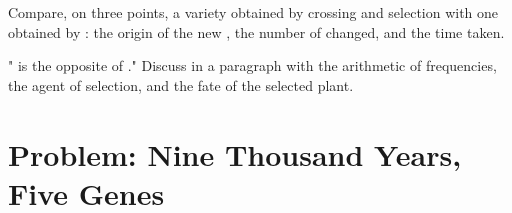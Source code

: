 \begin{exercise}[$\star\star\star$]\label{exo:g12:domesticated-plants:14}
Compare, on three points, a variety obtained by crossing and
selection with one obtained by : the origin of the new
, the number of  changed, and the time taken.
\end{exercise}

\begin{exercise}[$\star\star\star$]\label{exo:g12:domesticated-plants:15}
" is the opposite of ." Discuss in a
paragraph with the arithmetic of  frequencies, the agent of
selection, and the fate of the selected plant.
\end{exercise}

\section{Problem: Nine Thousand Years, Five Genes}

